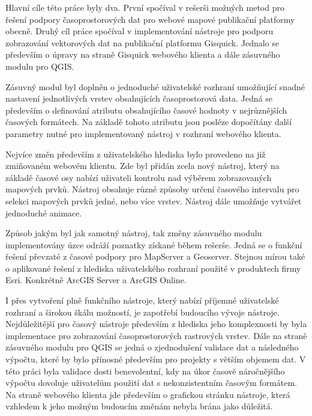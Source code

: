 \newpage
{}
Hlavní cíle této práce byly dva. První spočíval v rešerši možných metod pro řešení podpory časoprostorových dat pro webové mapové publikační platformy obecně. Druhý cíl práce spočíval v implementování nástroje pro podporu zobrazování vektorových dat na publikační platformu Gisquick. Jednalo se především o úpravy na straně Gisquick webového klienta a dále zásuvného modulu pro QGIS.

Zásuvný modul byl doplněn o jednoduché uživatelské rozhraní umožňující snadné nastavení jednotlivých vrstev obsahujících časoprostorová data. Jedná se především o definování atributu obsahujícího časové hodnoty v nejrůznějších časových formátech. Na základě tohoto atributu jsou posléze dopočítány další parametry nutné pro implementovaný nástroj v rozhraní webového klienta.

Nejvíce změn především z uživatelského hlediska bylo provedeno na již zmiňovaném webovém klientu. Zde byl přidán zcela nový nástroj, který na základě časové osy nabízí uživateli kontrolu nad výběrem zobrazovaných mapových prvků. Nástroj obsahuje různé způsoby určení časového intervalu pro selekci mapových prvků jedné, nebo více vrstev. Nástroj dále umožňuje vytvářet jednoduché animace.

Způsob jakým byl jak samotný nástroj, tak změny zásuvného modulu implementovány úzce odráží poznatky získané během rešerše. Jedná se o funkční řešení převzaté z časové podpory pro MapServer a Geoserver. Stejnou mírou také o aplikované řešení z hlediska uživatelského rozhraní použité v produktech firmy Esri. Konkrétně ArcGIS Server a ArcGIS Online.

I přes vytvoření plně funkčního nástroje, který nabízí příjemné uživatelské rozhraní a širokou škálu možností, je zapotřebí budoucího vývoje nástroje. Nejdůležitější pro časový nástroje především z hlediska jeho komplexnosti by byla implementace pro zobrazování časoprostorových rastrových vrstev. Dále na straně zásuvného modulu pro QGIS se jedná o zjednodušení validace dat a následného výpočtu, které by bylo přínosné především pro projekty s větším objemem dat. V této práci byla validace dosti benevolentní, kdy na úkor časově náročnějšího výpočtu dovoluje uživatelům použití dat s nekonzistentním časovým formátem. Na straně webového klienta jde především o grafickou stránku nástroje, která vzhledem k jeho možným budoucím změnám nebyla brána jako důležitá.